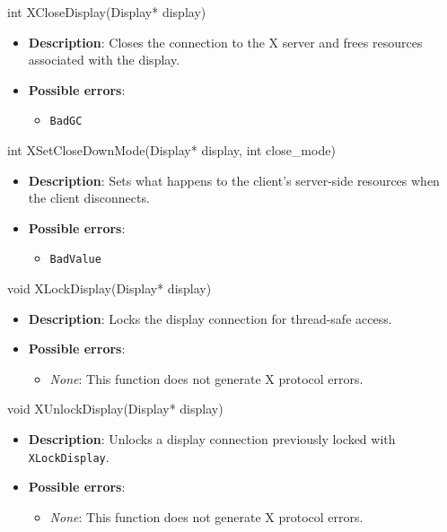 \documentclass{report}
\begin{document}
\begin{itemize}
        \begin{cppcode}
            int XCloseDisplay(Display* display)
        \end{cppcode}
        \begin{itemize}
            \item \textbf{Description}: Closes the connection to the X server and frees resources associated with the display.
            \item \textbf{Possible errors}:
                \begin{itemize}
                    \item \texttt{BadGC}
                \end{itemize}
        \end{itemize}

        \begin{cppcode}
            int XSetCloseDownMode(Display* display, int close_mode)
        \end{cppcode}
        \begin{itemize}
            \item \textbf{Description}: Sets what happens to the client's server-side resources when the client disconnects.
            \item \textbf{Possible errors}:
                \begin{itemize}
                    \item \texttt{BadValue}
                \end{itemize}
        \end{itemize}

        \begin{cppcode}
            void XLockDisplay(Display* display)
        \end{cppcode}
        \begin{itemize}
            \item \textbf{Description}: Locks the display connection for thread-safe access.
            \item \textbf{Possible errors}:
                \begin{itemize}
                    \item \textit{None}: This function does not generate X protocol errors.
                \end{itemize}
        \end{itemize}

        \begin{cppcode}
            void XUnlockDisplay(Display* display)
        \end{cppcode}
        \begin{itemize}
            \item \textbf{Description}: Unlocks a display connection previously locked with \texttt{XLockDisplay}.
            \item \textbf{Possible errors}:
                \begin{itemize}
                    \item \textit{None}: This function does not generate X protocol errors.
                \end{itemize}
        \end{itemize}


\end{itemize}
\end{document}

